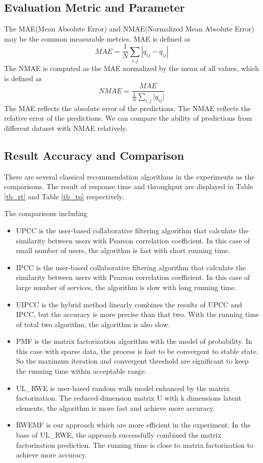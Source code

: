 \documentclass[conference]{IEEEtran}
\begin{document}
\subsection{Evaluation Metric and Parameter}
The MAE(Mean Absolute Error) and NMAE(Normalized Mean Absolute Error) may be the common measurable metrics. MAE is defined as 
\begin{equation}
MAE=\frac{1}{N}\sum_{i,j}{|q_{ij}-q^{\hat{}}_{ij}|}
\end{equation}
The NMAE is computed as the MAE normalized by the mean of all values, which is defined as 
\begin{equation}
NMAE=\frac{MAE}{\frac{1}{N}\sum_{i,j}{|q_{ij}}|}
\end{equation}
The MAE reflects the absolute error of the predictions. The NMAE reflects the relative error of the predictions. We can compare the ability of predictions from different dataset with NMAE relatively.

\subsection{Result Accuracy and Comparison}
\par There are several classical recommendation algorithms in the experiments as the comparisons. The result of response time and throughput
 are displayed in Table \ref{tb_rt} and Table \ref{tb_tp} respectively.
\par The comparisons including
\begin{itemize}
\item UPCC is the user-based collaborative filtering algorithm that calculate the similarity between users with Pearson correlation coefficient. In this case of small number of users, the algorithm is fast with short running time. 
\item IPCC is the user-based collaborative filtering algorithm that calculate the similarity between users with Pearson correlation coefficient. In this case of large number of services, the algorithm is slow with long running time. 
\item UIPCC is the hybrid method linearly combines the results of UPCC and IPCC, but the accuracy is more precise than that two. With the running time of total two algorithm, the algorithm is also slow.
\item PMF is the matrix factorization\cite{r_salakhutdinov__a_mnih_probability_2007}  algorithm with the model of probability. In this case with sparse data, the process is fast to be convergent to stable state. So the maximum iteration and convergent threshold are significant to keep the running time within acceptable range.
\item UL\_RWE is user-based random walk model enhanced by the matrix factorization. The reduced-dimension matrix U with k dimensions latent elements, the algorithm is more fast and achieve more accuracy.
\item RWEMF is our approach which are more efficient in the experiment. In the base of UL\_RWE, the approach successfully combined the matrix factorization prediction. The running time is close to matrix factorization to achieve more accuracy.
\end{itemize}
\end{document}
